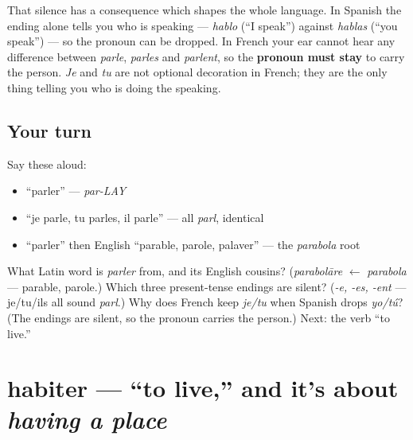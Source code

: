 \begin{grammarlens}[title={Grammar Lens: why French keeps its pronouns}]
That silence has a consequence which shapes the whole language. In Spanish the ending alone tells you who is speaking — \emph{hablo} (\textquotedblleft{}I speak\textquotedblright{}) against \emph{hablas} (\textquotedblleft{}you speak\textquotedblright{}) — so the pronoun can be dropped. In French your ear cannot hear any difference between \emph{parle}, \emph{parles} and \emph{parlent}, so the \textbf{pronoun must stay} to carry the person. \emph{Je} and \emph{tu} are not optional decoration in French; they are the only thing telling you who is doing the speaking.
\end{grammarlens}

\subsection*{Your turn}
Say these aloud:

\begin{itemize}
\raggedright
  \item \textquotedblleft{}parler\textquotedblright{} — \emph{par-LAY}
  \item \textquotedblleft{}je parle, tu parles, il parle\textquotedblright{} — all \emph{parl}, identical
  \item \textquotedblleft{}parler\textquotedblright{} then English \textquotedblleft{}parable, parole, palaver\textquotedblright{} — the \emph{parabola} root
\end{itemize}

\begin{tcolorbox}[breakable,colback=teal!4,colframe=teal!35!black,title={Before you move on}]
What Latin word is \emph{parler} from, and its English cousins? (\emph{parabolāre} $\leftarrow$ \emph{parabola} — parable, parole.) Which three present-tense endings are silent? (\emph{-e, -es, -ent} — je/tu/ils all sound \emph{parl}.) Why does French keep \emph{je/tu} when Spanish drops \emph{yo/tú}? (The endings are silent, so the pronoun carries the person.) Next: the verb \textquotedblleft{}to live.\textquotedblright{}
\end{tcolorbox}
\section[habiter]{habiter — \textquotedblleft{}to live,\textquotedblright{} and it's about \emph{having a place}}

\label{lesson:FR-C05-habiter}



